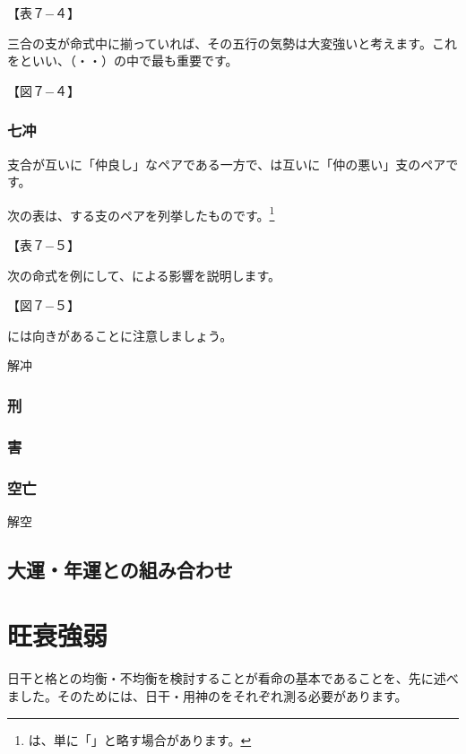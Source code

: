 \documentclass[a5paper,11pt,dvipdfmx]{tarticle}
\begin{document}
【表７−４】

三合の支が命式中に揃っていれば、その五行の気勢は大変強いと考えます。これをといい、（・・）の中で最も重要です。

【図７−４】

\subsubsection*{七冲}
支合が互いに「仲良し」なペアである一方で、は互いに「仲の悪い」支のペアです。

次の表は、する支のペアを列挙したものです。\footnote{は、単に「」と略す場合があります。}

【表７−５】

次の命式を例にして、による影響を説明します。

【図７−５】

には向きがあることに注意しましょう。



解冲


\subsubsection*{刑}


\subsubsection*{害}


\subsubsection*{空亡}


解空


\subsection{大運・年運との組み合わせ}



\clearpage

\section{旺衰強弱}

日干と格との均衡・不均衡を検討することが看命の基本であることを、先に述べました。そのためには、日干・用神のをそれぞれ測る必要があります。
\end{document}
